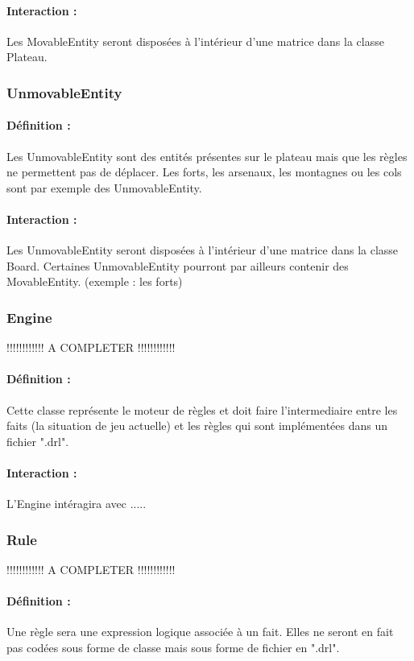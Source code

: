 \documentclass[12pt]{article}
\begin{document}
				\paragraph{Interaction :}
				Les MovableEntity seront disposées à l'intérieur d'une matrice dans la classe Plateau.

			\subsubsection{UnmovableEntity}

				\paragraph{Définition :}
				Les UnmovableEntity sont des entités présentes sur le plateau mais que les règles ne permettent pas de déplacer. 
				Les forts, les arsenaux, les montagnes ou les cols sont par exemple des UnmovableEntity.
				\paragraph{Interaction :}
				Les UnmovableEntity seront disposées à l'intérieur d'une matrice dans la classe Board. 
				Certaines UnmovableEntity pourront par ailleurs contenir des MovableEntity. (exemple : les forts)

			\subsubsection{Engine}

				!!!!!!!!!!!! A COMPLETER !!!!!!!!!!!!
				\paragraph{Définition :}
				Cette classe représente le moteur de règles et doit faire l'intermediaire entre les faits (la situation de jeu actuelle) 
				et les règles qui sont implémentées dans un fichier ".drl".
				\paragraph{Interaction :}
				L'Engine intéragira avec .....

			\subsubsection{Rule}

				!!!!!!!!!!!! A COMPLETER !!!!!!!!!!!!
				\paragraph{Définition :}
				Une règle sera une expression logique associée à un fait. Elles ne seront en fait pas codées sous forme de classe mais 
				sous forme de fichier en ".drl".
\end{document}
